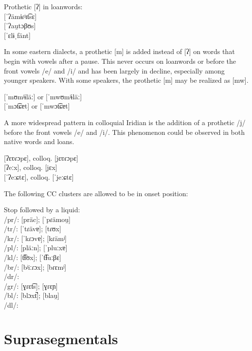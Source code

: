 \ex
Prothetic [ʔ] in loanwords:\\
 [ˈʔämɨɾʲɪt͡sɛ]\\
 [ˈʔau̯tɔβʊs] \\
 [ˈɛlɨˌfänt]
\xe

In some eastern dialects, a prothetic [m] is added instead of [ʔ] on words that
begin with vowels after a pause. This never occurs on loanwords or before the
front vowels /e/ and /i/ and has been largely in decline, especially among
younger speakers. With some speakers, the prothetic [m] may be realized as [mw].

\ex
{} [ˈmʊmʲɨläː] or [ˈmwʊmʲɨläː]\\
 [ˈmɔt͡ɕɐt] or [ˈmwɔt͡ɕɐt]
\xe

A more widespread pattern in colloquial Iridian is the addition of a prothetic
/j/ before the front vowels /e/ and /i/. This phenomenon could be observed in
both native words and loans.

\ex
{} [ʔɛʋɾɔpɛ], colloq. [jɛʋɾɔpɛ] \\
 [ʔeːx], colloq. [jɛx]\\
 [ˈʔeːɕtɛ], colloq. [ˈjeːɕtɛ]
\xe


The following CC clusters are allowed to be in onset position:

\pex
\a Stop followed by a liquid:\\
/pr/:  [präc];  [ˈpɾämou̯]\\
/tr/:  [ˈtɾävɐ];  [tɾʊx]\\
/kr/:  [ˈkɾɔvɐ];  [kɾämʲ]\\
/pl/:  [pläːn];  [ˈpluːxɐ]\\
/kl/:  [t͡ɬʊx];  [ˈt͡ɬuːβɛ]\\
/br/:  [bʲiːɾɔx];  [bɾɛmʲ]\\
/dr/: \\
/gr/:  [ɣɾɛt͡s];  [ɣɾɛɲ]\\
/bl/:  [blɔxt̚];  [blau̯]\\
/dl/:
\xe

\section{Suprasegmentals}

